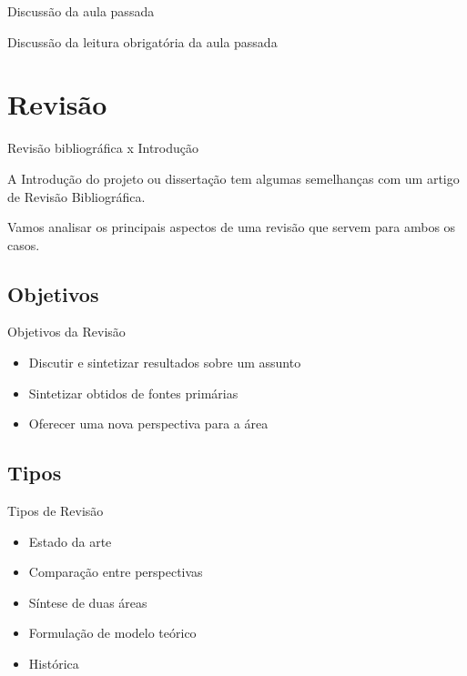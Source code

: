 \documentclass{beamer}
\begin{document}

\begin{frame}{Discussão da aula passada}
  \begin{block}{}
    Discussão da leitura obrigatória da aula passada
  \end{block}
\end{frame}

\section{Revisão}

\begin{frame}{Revisão bibliográfica x Introdução}
  \begin{block}{}
    A Introdução do projeto ou dissertação tem algumas semelhanças com
    um artigo de Revisão Bibliográfica.

    \bigskip

    Vamos analisar os principais aspectos de uma revisão que servem
    para ambos os casos.
  \end{block}
\end{frame}

\subsection{Objetivos}

\begin{frame}{Objetivos da Revisão}
  \begin{itemize}
  \item Discutir e sintetizar resultados sobre um assunto
  \item Sintetizar obtidos de fontes primárias
  \item Oferecer uma nova perspectiva para a área
  \end{itemize}
\end{frame}

\subsection{Tipos}

\begin{frame}{Tipos de Revisão}
  \begin{itemize}
  \item Estado da arte
  \item Comparação entre perspectivas
  \item Síntese de duas áreas
  \item Formulação de modelo teórico
  \item Histórica
  \end{itemize}
\end{frame}
\end{document}

